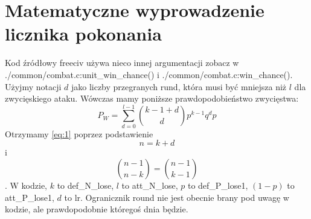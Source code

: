 \documentclass{article}
\begin{document}
\section{Matematyczne wyprowadzenie licznika pokonania}
Kod źródłowy freeciv używa nieco innej argumentacji \linebreak  zobacz w ./common/combat.c:unit\_win\_chance()
i \linebreak ./common/combat.c:win\_chance(). Użyjmy notacji $d$ jako liczby przegranych rund, która musi być mniejsza niż $l$ dla zwycięskiego ataku. Wówczas mamy poniższe prawdopodobieństwo zwycięstwa:
\begin{equation*}
    P_W = \sum^{l-1}_{d=0}
    \binom{k-1+d}{d}
    p^{k-1}
    q^{d}
    p
\end{equation*}
Otrzymamy \eqref{eq:1} poprzez podstawienie
\begin{equation*}
    n = k + d
\end{equation*}
i 
\begin{equation*}
    \binom{n-1}{n-k} = \binom{n-1}{k-1}
\end{equation*}.
W kodzie,\newline
$k$ to def\_N\_lose,\newline
$l$ to att\_N\_lose,\newline
$p$ to def\_P\_lose1,\newline
$(1-p)$ to att\_P\_lose1,\newline
$d$ to lr.\newline
Ogranicznik round nie jest obecnie brany pod uwagę w kodzie, ale prawdopodobnie któregoś dnia będzie.
\end{document}
